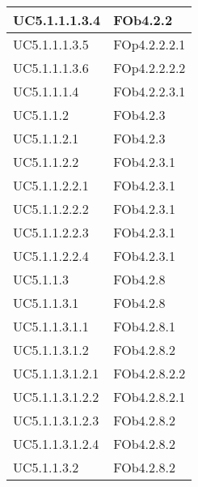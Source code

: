 \begin{longtable}{|l|p{4cm}|}
\hline
		UC5.1.1.1.3.4 & FOb4.2.2 \linebreak   \\
\hline
		UC5.1.1.1.3.5 & FOp4.2.2.2.1 \linebreak   \\
\hline
		UC5.1.1.1.3.6 & FOp4.2.2.2.2 \linebreak   \\
\hline
		UC5.1.1.1.4 & FOb4.2.2.3.1 \linebreak   \\
\hline
		UC5.1.1.2 & FOb4.2.3 \linebreak   \\
\hline
		UC5.1.1.2.1 & FOb4.2.3 \linebreak   \\
\hline
		UC5.1.1.2.2 & FOb4.2.3.1 \linebreak   \\
\hline
		UC5.1.1.2.2.1 & FOb4.2.3.1 \linebreak   \\
\hline
		UC5.1.1.2.2.2 & FOb4.2.3.1 \linebreak   \\
\hline
		UC5.1.1.2.2.3 & FOb4.2.3.1 \linebreak   \\
\hline
		UC5.1.1.2.2.4 & FOb4.2.3.1 \linebreak   \\
\hline
		UC5.1.1.3 & FOb4.2.8 \linebreak   \\
\hline
		UC5.1.1.3.1 & FOb4.2.8 \linebreak   \\
\hline
		UC5.1.1.3.1.1 & FOb4.2.8.1 \linebreak   \\
\hline
		UC5.1.1.3.1.2 & FOb4.2.8.2 \linebreak   \\
\hline
		UC5.1.1.3.1.2.1 & FOb4.2.8.2.2 \linebreak   \\
\hline
		UC5.1.1.3.1.2.2 & FOb4.2.8.2.1 \linebreak   \\
\hline
		UC5.1.1.3.1.2.3 & FOb4.2.8.2 \linebreak   \\
\hline
		UC5.1.1.3.1.2.4 & FOb4.2.8.2 \linebreak   \\
\hline
		UC5.1.1.3.2 & FOb4.2.8.2 \linebreak   \\

\end{longtable}
